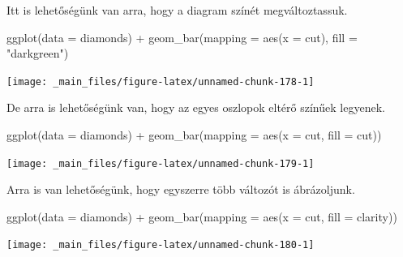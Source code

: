 \documentclass[
]{book}
\newenvironment{Shaded}{\begin{snugshade}}{\end{snugshade}}
\newcommand{\AttributeTok}[1]{\textcolor[rgb]{0.77,0.63,0.00}{#1}}
\newcommand{\FunctionTok}[1]{\textcolor[rgb]{0.00,0.00,0.00}{#1}}
\newcommand{\NormalTok}[1]{#1}
\newcommand{\SpecialCharTok}[1]{\textcolor[rgb]{0.00,0.00,0.00}{#1}}
\newcommand{\StringTok}[1]{\textcolor[rgb]{0.31,0.60,0.02}{#1}}
\begin{document}
Itt is lehetőségünk van arra, hogy a diagram színét megváltoztassuk.

\begin{Shaded}
\begin{Highlighting}[]
\FunctionTok{ggplot}\NormalTok{(}\AttributeTok{data =}\NormalTok{ diamonds) }\SpecialCharTok{+}
  \FunctionTok{geom\_bar}\NormalTok{(}\AttributeTok{mapping =} \FunctionTok{aes}\NormalTok{(}\AttributeTok{x =}\NormalTok{ cut), }\AttributeTok{fill =} \StringTok{"darkgreen"}\NormalTok{)}
\end{Highlighting}
\end{Shaded}

\begin{center}\texttt{[image: \_main\_files/figure-latex/unnamed-chunk-178-1]} \end{center}

De arra is lehetőségünk van, hogy az egyes oszlopok eltérő színűek
legyenek.

\begin{Shaded}
\begin{Highlighting}[]
\FunctionTok{ggplot}\NormalTok{(}\AttributeTok{data =}\NormalTok{ diamonds) }\SpecialCharTok{+}
  \FunctionTok{geom\_bar}\NormalTok{(}\AttributeTok{mapping =} \FunctionTok{aes}\NormalTok{(}\AttributeTok{x =}\NormalTok{ cut, }\AttributeTok{fill =}\NormalTok{ cut))}
\end{Highlighting}
\end{Shaded}

\begin{center}\texttt{[image: \_main\_files/figure-latex/unnamed-chunk-179-1]} \end{center}

Arra is van lehetőségünk, hogy egyszerre több változót is ábrázoljunk.

\begin{Shaded}
\begin{Highlighting}[]
\FunctionTok{ggplot}\NormalTok{(}\AttributeTok{data =}\NormalTok{ diamonds) }\SpecialCharTok{+}
  \FunctionTok{geom\_bar}\NormalTok{(}\AttributeTok{mapping =} \FunctionTok{aes}\NormalTok{(}\AttributeTok{x =}\NormalTok{ cut, }\AttributeTok{fill =}\NormalTok{ clarity))}
\end{Highlighting}
\end{Shaded}

\begin{center}\texttt{[image: \_main\_files/figure-latex/unnamed-chunk-180-1]} \end{center}
\end{document}
